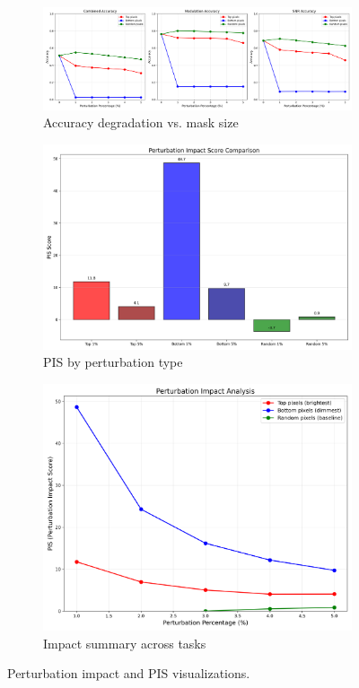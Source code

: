 \documentclass{ELSP}
\begin{document}
\begin{figure}[t]
  \centering
  \begin{subfigure}[t]{0.32\linewidth}
    \centering
    \includegraphics[width=\linewidth]{fig/accuracy_degradation_curves.png}
    \caption{Accuracy degradation vs. mask size}
  \end{subfigure}\hfill
  \begin{subfigure}[t]{0.32\linewidth}
    \centering
    \includegraphics[width=\linewidth]{fig/pis_comparison_bar_chart.png}
    \caption{PIS by perturbation type}
  \end{subfigure}\hfill
  \begin{subfigure}[t]{0.32\linewidth}
    \centering
    \includegraphics[width=\linewidth]{fig/perturbation_impact_chart.png}
    \caption{Impact summary across tasks}
  \end{subfigure}
  \caption{Perturbation impact and PIS visualizations.}
  \label{fig:pis_plots}
\end{figure}
\end{document}
